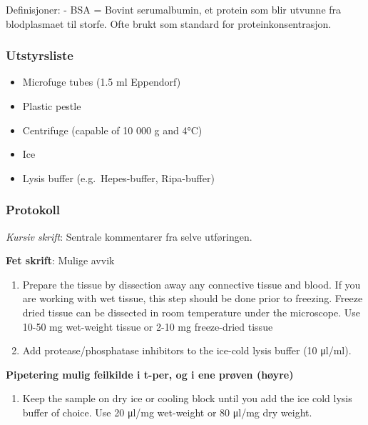 \documentclass[
  letterpaper,
  DIV=11,
  numbers=noendperiod]{scrreprt}
\providecommand{\tightlist}{%
  \setlength{\itemsep}{0pt}\setlength{\parskip}{0pt}}\usepackage{longtable,booktabs,array}
\begin{document}
Definisjoner: - BSA = Bovint serumalbumin, et protein som blir utvunne
fra blodplasmaet til storfe. Ofte brukt som standard for
proteinkonsentrasjon.

\subsubsection{Utstyrsliste}\label{utstyrsliste}

\begin{itemize}
\tightlist
\item
  Microfuge tubes (1.5 ml Eppendorf)
\item
  Plastic pestle
\item
  Centrifuge (capable of 10 000 g and 4°C)
\item
  Ice
\item
  Lysis buffer (e.g.~Hepes-buffer, Ripa-buffer)
\end{itemize}

\subsubsection{Protokoll}\label{protokoll-2}

\emph{Kursiv skrift}: Sentrale kommentarer fra selve utføringen.

\textbf{Fet skrift}: Mulige avvik

\begin{enumerate}
\def\labelenumi{\arabic{enumi}.}
\item
  Prepare the tissue by dissection away any connective tissue and blood.
  If you are working with wet tissue, this step should be done prior to
  freezing. Freeze dried tissue can be dissected in room temperature
  under the microscope. Use 10-50 mg wet-weight tissue or 2-10 mg
  freeze-dried tissue
\item
  Add protease/phosphatase inhibitors to the ice-cold lysis buffer (10
  μl/ml).
\end{enumerate}

\textbf{Pipetering mulig feilkilde i t-per, og i ene prøven (høyre)}

\begin{enumerate}
\def\labelenumi{\arabic{enumi}.}
\setcounter{enumi}{2}
\tightlist
\item
  Keep the sample on dry ice or cooling block until you add the ice cold
  lysis buffer of choice. Use 20 μl/mg wet-weight or 80 μl/mg dry
  weight.
\end{enumerate}
\end{document}
